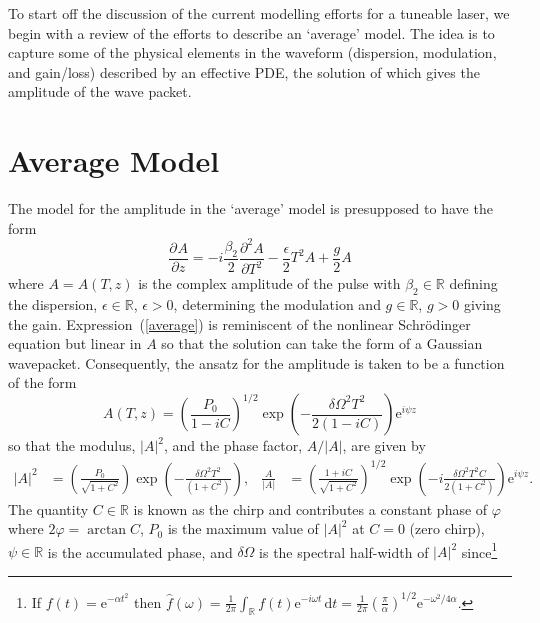 \documentclass[12pt]{article}
\title{}
\author{Brady Metherall \& C.\ Sean Bohun}
\providecommand{\df}{\textrm{d}}
\newcommand{\pdiff}[3][]{\frac{\partial^{#1}#2}{\partial{#3}^{#1}}}
\begin{document}
\maketitle

\noindent
To start off the discussion of the current modelling efforts for a tuneable laser, we begin with a review of the efforts to describe an `average' model. The idea is to capture some of the physical elements in the waveform (dispersion, modulation, and gain/loss) described by an effective PDE, the solution of which gives the amplitude of the wave packet.

\section{Average Model}
The model for the amplitude in the `average' model is presupposed to have the form
\begin{equation}
\label{average}
	\pdiff{A}{z} = -i\frac{\beta_2}{2}\pdiff[2]{A}{T} - \frac{\epsilon}{2}T^2 A + \frac{g}{2}A
\end{equation}
where $A=A(T,z)$ is the complex amplitude of the pulse with $\beta_2 \in \mathbb{R}$ defining the dispersion, $\epsilon \in \mathbb{R}$, $\epsilon > 0$, determining the modulation and $g \in \mathbb{R}$, $g > 0$ giving the gain. Expression~(\ref{average}) is reminiscent of the nonlinear Schr\"odinger equation but linear in $A$ so that the solution can take the form of a Gaussian wavepacket. Consequently, the ansatz for the amplitude is taken to be a function of the form
\begin{equation}
\label{ansatz}
	A(T,z) = \left(\frac{P_0}{1-i C}\right)^{1/2}\exp
	\left(-\frac{\delta \Omega^2 T^2}{2(1-i C)}\right)\textrm{e}^{i\psi z}
\end{equation}
so that the modulus, $|A|^2$, and the phase factor, $A/|A|$, are given by
\begin{align*}
	\left|A\right|^2 &= \left(\frac{P_0}{\sqrt{1 + C^2}}\right)
	\exp\left(-\frac{\delta \Omega^2 T^2}{(1 + C^2)}\right),&
	\frac{A}{|A|} &= \left(\frac{1+iC}{\sqrt{1+C^2}}\right)^{1/2}\exp
	\left(-i\frac{\delta \Omega^2 T^2 C}{2(1+C^2)}\right)\textrm{e}^{i\psi z}.
\end{align*}
The quantity $C \in \mathbb{R}$ is known as the chirp and contributes a constant phase of $\varphi$ where $2\varphi = \arctan C$, $P_0$ is the maximum value of $|A|^2$ at $C=0$ (zero chirp), $\psi \in \mathbb{R}$ is the accumulated phase, and $\delta\Omega$ is the spectral half-width of $|A|^2$ since\footnote{If $f(t) = \textrm{e}^{-\alpha t^2}$ then $\hat{f}(\omega) = \frac{1}{2\pi}\int_{\mathbb{R}} f(t)\textrm{e}^{-i\omega t}\, \df t = \frac{1}{2\pi} (\frac{\pi}{\alpha})^{1/2}\textrm{e}^{-\omega^2/4\alpha}$.}
\end{document}

